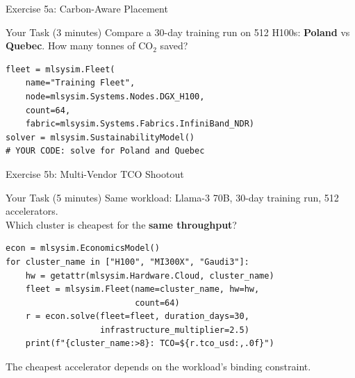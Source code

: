 \documentclass[aspectratio=169, 12pt]{beamer}
\begin{document}
\begin{frame}[fragile]{Exercise 5a: Carbon-Aware Placement}

\begin{alertblock}{Your Task (3 minutes)}
Compare a 30-day training run on 512 H100s:
\textbf{Poland} vs \textbf{Quebec}. How many tonnes of CO$_2$ saved?
\end{alertblock}

\begin{lstlisting}
fleet = mlsysim.Fleet(
    name="Training Fleet",
    node=mlsysim.Systems.Nodes.DGX_H100,
    count=64,
    fabric=mlsysim.Systems.Fabrics.InfiniBand_NDR)
solver = mlsysim.SustainabilityModel()
# YOUR CODE: solve for Poland and Quebec
\end{lstlisting}
\end{frame}

\begin{frame}[fragile]{Exercise 5b: Multi-Vendor TCO Shootout}

\begin{alertblock}{Your Task (5 minutes)}
Same workload: Llama-3 70B, 30-day training run, 512 accelerators.\\
Which cluster is cheapest for the \textbf{same throughput}?
\end{alertblock}

\begin{lstlisting}
econ = mlsysim.EconomicsModel()
for cluster_name in ["H100", "MI300X", "Gaudi3"]:
    hw = getattr(mlsysim.Hardware.Cloud, cluster_name)
    fleet = mlsysim.Fleet(name=cluster_name, hw=hw,
                          count=64)
    r = econ.solve(fleet=fleet, duration_days=30,
                   infrastructure_multiplier=2.5)
    print(f"{cluster_name:>8}: TCO=${r.tco_usd:,.0f}")
\end{lstlisting}

\small
\alert{The cheapest accelerator depends on the workload's binding constraint.}
\end{frame}
\end{document}
